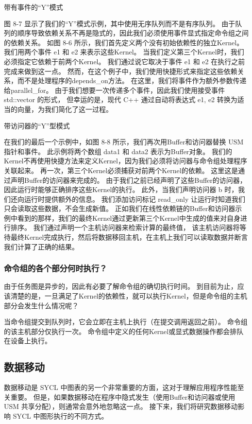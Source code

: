 {\color{red} 带有事件的“Y”模式}

图 8-7 显示了我们的“Y”模式示例，其中使用无序队列而不是有序队列。 
由于队列的顺序导致依赖关系不再是隐式的，因此我们必须使用事件显式指定命令组之间的依赖关系。 
如图 8-6 所示，我们首先定义两个没有初始依赖性的独立Kernel。 我们用两个事件 e1 和 e2 来表示这些Kernel。 
当我们定义第三个Kernel时，我们必须指定它依赖于前两个Kernel。 
我们通过说它取决于事件 e1 和 e2 在执行之前完成来做到这一点。 
然而，在这个例子中，我们使用快捷形式来指定这些依赖关系，而不是处理程序的depends\_on方法。 
在这里，我们将事件作为额外参数传递给parallel\_for。 
由于我们想要一次传递多个事件，因此我们使用接受事件 std::vector 的形式，
但幸运的是，现代 C++ 通过自动将表达式 {e1, e2} 转换为适当的向量，为我们简化了这一过程。

{\color{red} 带访问器的“Y”型模式}

在我们的最后一个示例中，如图 8-8 所示，我们再次用Buffer和访问器替换 USM 指针和事件。 
此示例将两个数组 data1 和 data2 表示为Buffer对象。 
我们的Kernel不再使用快捷方法来定义Kernel，因为我们必须将访问器与命令组处理程序关联起来。 
再一次，第三个Kernel必须捕获对前两个Kernel的依赖。 这里这是通过声明Buffer的访问器来完成的。 
由于我们之前已经声明了这些Buffer的访问器，因此运行时能够正确排序这些Kernel的执行。 
此外，当我们声明访问器 b 时，我们还向运行时提供额外的信息。 
我们添加访问标记 read\_only 让运行时知道我们只会读取这些数据，不会生成新值。 
正如我们在线性依赖链的Buffer和访问器示例中看到的那样，我们的最终Kernel通过更新第三个Kernel中生成的值来对自身进行排序。 
我们通过声明一个主机访问器来检索计算的最终值，
该主机访问器将等待最终Kernel完成执行，然后将数据移回主机，在主机上我们可以读取数据并断言我们计算了正确的结果。

\subsubsection{命令组的各个部分何时执行？}
由于任务图是异步的，因此有必要了解命令组的确切执行时间。 
到目前为止，应该清楚的是，一旦满足了Kernel的依赖性，就可以执行Kernel，但是命令组的主机部分会发生什么情况呢？

当命令组提交到队列时，它会立即在主机上执行（在提交调用返回之前）。 
命令组的该主机部分仅执行一次。 命令组中定义的任何Kernel或显式数据操作都会排队在设备上执行。

\subsection{数据移动}
数据移动是 SYCL 中图表的另一个非常重要的方面，这对于理解应用程序性能至关重要。 
但是，如果数据移动在程序中隐式发生（使用Buffer和访问器或使用 USM 共享分配），则通常会意外地忽略这一点。 
接下来，我们将研究数据移动影响 SYCL 中图形执行的不同方式。

